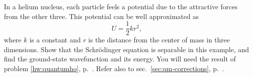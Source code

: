 In a helium nucleus, each particle feels a potential due to the attractive
forces from the other three. This potential can be well approximated as
\begin{equation*}
  U = \frac{1}{2}kr^2,
\end{equation*}
where $k$ is a constant and $r$ is the distance from the center of mass in three dimensions.
Show that the Schr\"odinger equation is separable in this example, and
find the ground-state wavefunction and its energy. You will need the result of problem
\ref{hw:quantumho}, p.~\pageref{hw:quantumho}. Refer also to sec.~\ref{sec:qm-corrections},
p.~\pageref{sec:qm-corrections}.
